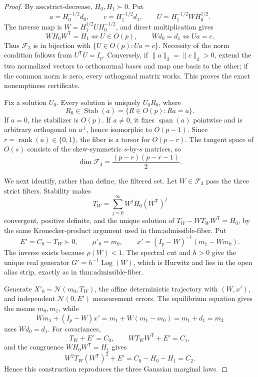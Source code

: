 \documentclass{article}
\begin{document}
\begin{proof}
By \(\text{ass:strict-decrease}\), \(H_0,H_1\succ0\).  Put
\[
 a=H_0^{-1/2}d_0,\qquad c=H_1^{-1/2}d_1,\qquad
 U=H_1^{-1/2}WH_0^{1/2}.
\]
The inverse map is \(W=H_1^{1/2}UH_0^{-1/2}\), and direct multiplication gives
\[
 WH_0W^{\mathsf T}=H_1\Longleftrightarrow U\in O(p),
 \qquad Wd_0=d_1\Longleftrightarrow Ua=c.
\]
Thus \(\mathcal F_3\) is in bijection with \(\{U\in O(p):Ua=c\}\).  Necessity of the norm condition follows from \(U^{\mathsf T}U=I_p\).  Conversely, if \(\lVert a\rVert_2=\lVert c\rVert_2>0\), extend the two normalized vectors to orthonormal bases and map one basis to the other; if the common norm is zero, every orthogonal matrix works.  This proves the exact nonemptiness certificate.

Fix a solution \(U_0\).  Every solution is uniquely \(U_0R_0\), where
\[
 R_0\in\operatorname{Stab}(a)=\{R\in O(p):Ra=a\}.
\]
If \(a=0\), the stabilizer is \(O(p)\).  If \(a\ne0\), it fixes \(\operatorname{span}(a)\) pointwise and is arbitrary orthogonal on \(a^\perp\), hence isomorphic to \(O(p-1)\).  Since \(r=\operatorname{rank}(a)\in\{0,1\}\), the fiber is a torsor for \(O(p-r)\).  The tangent space of \(O(s)\) consists of the skew-symmetric \(s\)-by-\(s\) matrices, so
\[
 \dim\mathcal F_3=\frac{(p-r)(p-r-1)}2.
\]

We next identify, rather than define, the filtered set.  Let \(W\in\mathcal F_3\) pass the three strict filters.  Stability makes
\[
 T_W=\sum_{j=0}^{\infty}W^jH_0(W^{\mathsf T})^j
\]
convergent, positive definite, and the unique solution of \(T_W-WT_WW^{\mathsf T}=H_0\), by the same Kronecker-product argument used in \(\text{thm:admissible-fiber}\).  Put
\[
 E'=C_0-T_W\succ0,\qquad \mu'_0=m_0,\qquad
 x'=(I_p-W)^{-1}(m_1-Wm_0).
\]
The inverse exists because \(\rho(W)<1\).  The spectral cut and \(h>0\) give the unique real generator \(G'=h^{-1}\operatorname{Log}(W)\), which is Hurwitz and lies in the open alias strip, exactly as in \(\text{thm:admissible-fiber}\).

Generate \(X'_0\sim\mathcal N(m_0,T_W)\), the affine deterministic trajectory with \((W,x')\), and independent \(\mathcal N(0,E')\) measurement errors.  The equilibrium equation gives the means \(m_0,m_1\), while
\[
 Wm_1+(I_p-W)x'=m_1+W(m_1-m_0)=m_1+d_1=m_2
\]
uses \(Wd_0=d_1\).  For covariances,
\[
 T_W+E'=C_0,\qquad WT_WW^{\mathsf T}+E'=C_1,
\]
and the congruence \(WH_0W^{\mathsf T}=H_1\) gives
\[
 W^2T_W(W^{\mathsf T})^2+E'
 =C_0-H_0-H_1=C_2.
\]
Hence this construction reproduces the three Gaussian marginal laws.


\end{proof}
\end{document}
